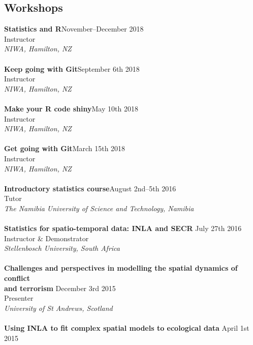 \documentclass[10pt,letter]{article}
\begin{document}
\subsection*{Workshops}
\vspace{1mm}
{\textbf{Statistics and R}}\hfill November--December 2018\\
Instructor \\
 {\sl NIWA, Hamilton, NZ}\\
 \hdashrule[0.5ex]{4cm}{1pt}{1pt}\\
{\textbf{Keep going with Git}}\hfill September 6th 2018\\
Instructor \\
 {\sl NIWA, Hamilton, NZ}\\
 \hdashrule[0.5ex]{4cm}{1pt}{1pt}\\
{\textbf{Make your R code shiny}}\hfill May 10th 2018\\
Instructor \\
 {\sl NIWA, Hamilton, NZ}\\
 \hdashrule[0.5ex]{4cm}{1pt}{1pt}\\
{\textbf{Get going with Git}}\hfill March 15th 2018\\
Instructor \\
 {\sl NIWA, Hamilton, NZ}\\
 \hdashrule[0.5ex]{4cm}{1pt}{1pt}\\
{\textbf{Introductory statistics course}}\hfill August 2nd--5th 2016\\
Tutor \\
 {\sl The Namibia University of Science and Technology, Namibia}\\
 \hdashrule[0.5ex]{4cm}{1pt}{1pt}\\
 {\textbf{{Statistics for spatio-temporal data: INLA and SECR }}} \hfill July 27th 2016\\
 Instructor \& Demonstrator\\
 {\sl Stellenbosch University, South Africa}\\
 \hdashrule[0.5ex]{4cm}{1pt}{1pt}\\
 {\textbf{{Challenges and perspectives in modelling the spatial dynamics of conflict\\ and terrorism }}} \hfill December 3rd 2015\\
 Presenter\\
 {\sl University of St Andrews, Scotland}\\
 \hdashrule[0.5ex]{4cm}{1pt}{1pt}\\
{\textbf{{Using INLA to fit complex spatial models to ecological data }}} \hfill April 1st 2015\\
\end{document}
